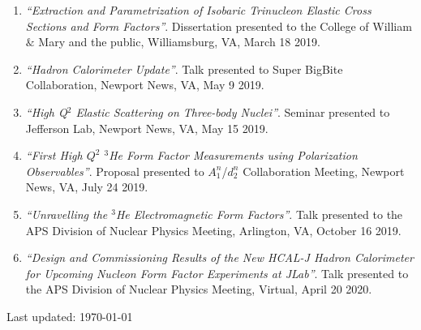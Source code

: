 \documentclass[letterpaper,10pt]{article}
\def\footerlink{}
\begin{document}
{\begin{enumerate}
		\item \textit{``Extraction and Parametrization of Isobaric Trinucleon Elastic Cross Sections and Form Factors''}. Dissertation presented to the College of William $\&$ Mary and the public, Williamsburg, VA, March 18 2019.
		
		\item \textit{``Hadron Calorimeter Update''}. Talk presented to Super BigBite Collaboration, Newport News, VA, May 9 2019.
		
		\item \textit{``High Q$^2$ Elastic Scattering on Three-body Nuclei''}. Seminar presented to Jefferson Lab, Newport News, VA, May 15 2019.
		
		\item \textit{``First High $Q^2$ $^3$He Form Factor Measurements using Polarization Observables''}. Proposal presented to $A_1^n$/$d_2^n$ Collaboration Meeting, Newport News, VA, July 24 2019.
		
		\item \textit{``Unravelling the $^3$He Electromagnetic Form Factors''}. Talk presented to the APS Division of Nuclear Physics Meeting, Arlington, VA, October 16 2019.
		
		\item \textit{``Design and Commissioning Results of the New HCAL-J Hadron Calorimeter for Upcoming Nucleon Form Factor Experiments at JLab''}. Talk presented to the APS Division of Nuclear Physics Meeting, Virtual, April 20 2020.
	
	\end{enumerate}


\bigskip
\begin{center}
  \begin{footnotesize}
    Last updated: \today \\
    \href{\footerlink}{\texttt{\footerlink}}
  \end{footnotesize}
\end{center}
}
\end{document}
